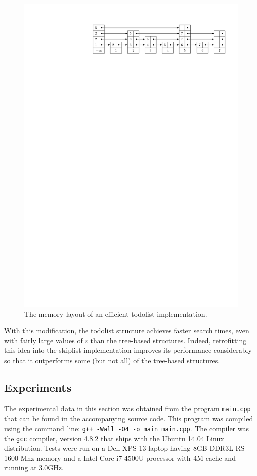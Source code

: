 \documentclass[lotsofwhite]{patmorin}
\newcommand{\eps}{\varepsilon}
\begin{document}
\begin{figure}
   \centerline{\includegraphics{packed-in}}
   \caption{The memory layout of an efficient todolist implementation.}
\end{figure}

With this modification, the todolist structure achieves faster search
times, even with fairly large values of $\eps$ than the tree-based
structures. Indeed, retrofitting this idea into the skiplist
implementation improves its performance considerably so that it
outperforms some (but not all) of the tree-based structures.

\subsection{Experiments}

The experimental data in this section was obtained from the program
\texttt{main.cpp} that can be found in the accompanying source code.
This program was compiled using the command line: \texttt{g++ -Wall -O4 -o
main main.cpp}. The compiler was the \texttt{gcc} compiler, version
4.8.2 that ships with the Ubuntu 14.04 Linux distribution.  Tests were
run on a Dell XPS 13 laptop having 8GB DDR3L-RS 1600 Mhz memory and a
Intel Core i7-4500U processor with 4M cache and running at 3.0GHz.
\end{document}
